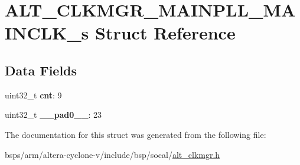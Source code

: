 \hypertarget{structALT__CLKMGR__MAINPLL__MAINCLK__s}{}\section{A\+L\+T\+\_\+\+C\+L\+K\+M\+G\+R\+\_\+\+M\+A\+I\+N\+P\+L\+L\+\_\+\+M\+A\+I\+N\+C\+L\+K\+\_\+s Struct Reference}
\label{structALT__CLKMGR__MAINPLL__MAINCLK__s}
\subsection*{Data Fields}
\begin{DoxyCompactItemize}
\item 
\mbox{\label{structALT__CLKMGR__MAINPLL__MAINCLK__s_a1149d8e7a27476da84ffafacbf3df4d6}} 
uint32\+\_\+t {\bfseries cnt}\+: 9
\item 
\mbox{\label{structALT__CLKMGR__MAINPLL__MAINCLK__s_ab368bf9e3e6a78337e00fef0dd35297f}} 
uint32\+\_\+t {\bfseries \+\_\+\+\_\+pad0\+\_\+\+\_\+}\+: 23
\end{DoxyCompactItemize}


The documentation for this struct was generated from the following file\+:\begin{DoxyCompactItemize}
\item 
bsps/arm/altera-\/cyclone-\/v/include/bsp/socal/\mbox{\hyperlink{alt__clkmgr_8h}{alt\+\_\+clkmgr.\+h}}\end{DoxyCompactItemize}
